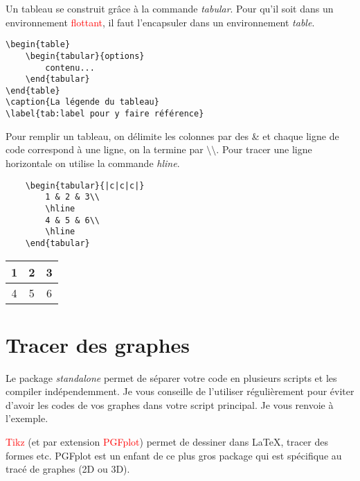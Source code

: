 \documentclass{beamer}
\begin{document}
\begin{frame}[fragile]
	Un tableau se construit grâce à la commande \textit{tabular}. Pour qu'il soit dans un environnement \textcolor{red}{flottant}, il faut l'encapsuler dans un environnement \textit{table}.
\begin{Verbatim}
\begin{table}
	\begin{tabular}{options}
		contenu...
	\end{tabular}
\end{table}
\caption{La légende du tableau}
\label{tab:label pour y faire référence}
\end{Verbatim}
\end{frame}

\begin{frame}[fragile]
	Pour remplir un tableau, on délimite les colonnes par des \& et chaque ligne de code correspond à une ligne, on la termine par $\setminus\setminus$. Pour tracer une ligne horizontale on utilise la commande \textit{hline}.
	\begin{Verbatim}
	\begin{tabular}{|c|c|c|}
		1 & 2 & 3\\
		\hline
		4 & 5 & 6\\
		\hline
	\end{tabular}
	\end{Verbatim}
	\vspace{.3cm}
	\begin{tabular}{|c|c|c|}
		\hline
		1 & 2 & 3\\
		\hline
		4 & 5 & 6\\
		\hline
	\end{tabular}
\end{frame}

\section{Tracer des graphes}

\begin{frame}[fragile]
	Le package \textit{standalone} permet de séparer votre code en plusieurs scripts et les compiler indépendemment. Je vous conseille de l'utiliser régulièrement pour éviter d'avoir les codes de vos graphes dans votre script principal. Je vous renvoie à l'exemple.

	\begin{definition}
		\textcolor{red}{Tikz} (et par extension \textcolor{red}{PGFplot}) permet de dessiner dans LaTeX, tracer des formes etc. PGFplot est un enfant de ce plus gros package qui est spécifique au tracé de graphes (2D ou 3D).
	\end{definition}
\end{frame}
\end{document}
